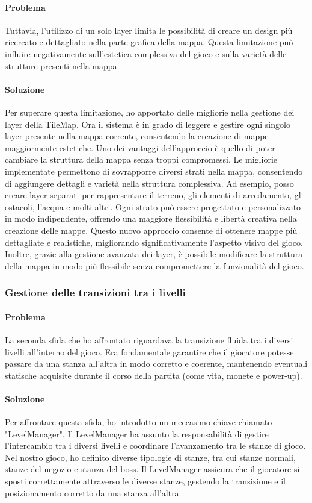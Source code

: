 \documentclass[a4paper,12pt]{report}
\begin{document}
\paragraph*{Problema}
Tuttavia, l'utilizzo di un solo layer limita le possibilità di creare un design più ricercato e dettagliato nella parte grafica della mappa. 
Questa limitazione può influire negativamente sull'estetica complessiva del gioco e sulla varietà delle strutture presenti nella mappa.
\paragraph*{Soluzione}
Per superare questa limitazione, ho apportato delle migliorie nella gestione dei layer della TileMap.
Ora il sistema è in grado di leggere e gestire ogni singolo layer presente nella mappa corrente, consentendo la creazione di mappe maggiormente estetiche.
Uno dei vantaggi dell'approccio è quello di poter cambiare la struttura della mappa senza troppi compromessi.
Le migliorie implementate permettono di sovrapporre diversi strati nella mappa, consentendo di aggiungere dettagli e varietà nella struttura complessiva. 
Ad esempio, posso creare layer separati per rappresentare il terreno, gli elementi di arredamento, gli ostacoli, l'acqua e molti altri. 
Ogni strato può essere progettato e personalizzato in modo indipendente, offrendo una maggiore flessibilità e libertà creativa nella creazione delle mappe.
Questo nuovo approccio consente di ottenere mappe più dettagliate e realistiche, migliorando significativamente l'aspetto visivo del gioco. 
Inoltre, grazie alla gestione avanzata dei layer, è possibile modificare la struttura della mappa in modo più flessibile senza compromettere la funzionalità del gioco.
\subsubsection*{Gestione delle transizioni tra i livelli}
\paragraph{Problema}
La seconda sfida che ho affrontato riguardava la transizione fluida tra i diversi livelli all'interno del gioco. 
Era fondamentale garantire che il giocatore potesse passare da una stanza all'altra in modo corretto e coerente, mantenendo eventuali statische acquisite durante il corso della partita (come vita, monete e power-up).
\paragraph{Soluzione}
Per affrontare questa sfida, ho introdotto un meccasimo chiave chiamato "LevelManager".
Il LevelManager ha assunto la responsabilità di gestire l'intercambio tra i diversi livelli e coordinare l'avanzamento tra le stanze di gioco. 
Nel nostro gioco, ho definito diverse tipologie di stanze, tra cui stanze normali, stanze del negozio e stanza del boss.
Il LevelManager assicura che il giocatore si sposti correttamente attraverso le diverse stanze, gestendo la transizione e il posizionamento corretto da una stanza all'altra.
\end{document}
